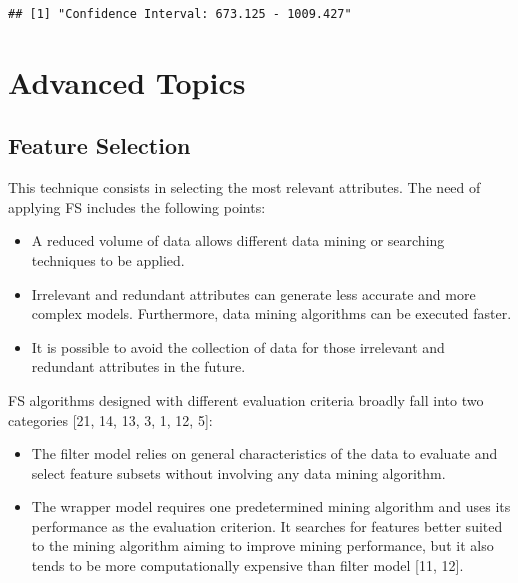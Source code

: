 \documentclass[]{book}
\newenvironment{Shaded}{\begin{snugshade}}{\end{snugshade}}
\newcommand{\CommentTok}[1]{\textcolor[rgb]{0.56,0.35,0.01}{\textit{{#1}}}}
\begin{document}
\begin{verbatim}
## [1] "Confidence Interval: 673.125 - 1009.427"
\end{verbatim}

\begin{Shaded}
\end{Shaded}

\part{Advanced Topics}\label{part-advanced-topics}

\chapter{Feature Selection}\label{feature-selection-1}

This technique consists in selecting the most relevant attributes. The
need of applying FS includes the following points:

\begin{itemize}
\item
  A reduced volume of data allows different data mining or searching
  techniques to be applied.
\item
  Irrelevant and redundant attributes can generate less accurate and
  more complex models. Furthermore, data mining algorithms can be
  executed faster.
\item
  It is possible to avoid the collection of data for those irrelevant
  and redundant attributes in the future.
\end{itemize}

FS algorithms designed with different evaluation criteria broadly fall
into two categories {[}21, 14, 13, 3, 1, 12, 5{]}:

\begin{itemize}
\item
  The filter model relies on general characteristics of the data to
  evaluate and select feature subsets without involving any data mining
  algorithm.
\item
  The wrapper model requires one predetermined mining algorithm and uses
  its performance as the evaluation criterion. It searches for features
  better suited to the mining algorithm aiming to improve mining
  performance, but it also tends to be more computationally expensive
  than filter model {[}11, 12{]}.
\end{itemize}
\end{document}
